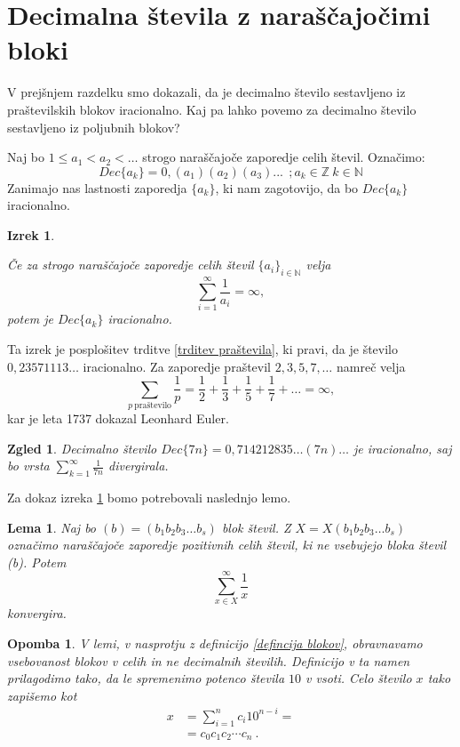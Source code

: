 \documentclass[a4paper,12pt]{article}
\def\N{\mathbb{N}} %
\def\Z{\mathbb{Z}} %
\newtheorem{izrek}{Izrek}
\newtheorem{lema}{Lema}
\newtheorem{opomba}{Opomba}
\newtheorem{zgled}{Zgled}
\begin{document}
\section{Decimalna števila z naraščajočimi bloki}

V prejšnjem razdelku smo dokazali, da je decimalno število sestavljeno iz praštevilskih
blokov iracionalno. Kaj pa lahko povemo za decimalno število sestavljeno iz poljubnih blokov?

Naj bo $1 \leq a_1 < a_2 < \dots $ strogo naraščajoče zaporedje celih števil. 
Označimo: \[Dec\{a_k\} = 0,(a_1)(a_2)(a_3)... \  \ ;  a_k \in \Z \ k \in \N \]
Zanimajo nas lastnosti zaporedja $\{a_k\}$, ki nam zagotovijo, da bo $Dec\{a_k\}$ iracionalno.


\begin{izrek}\label{irac1}
    
    Če za strogo naraščajoče zaporedje celih števil $\{a_i\}_{i \in \N}$ velja 
    \[ \sum_{i=1}^{\infty} \frac{1}{a_i} = \infty ,\]
    potem je $Dec\{a_k\}$ iracionalno.
\end{izrek}

Ta izrek je posplošitev trditve \ref{trditev praštevila}, ki pravi, da je število $0,23571113 \dots$
iracionalno. Za zaporedje praštevil $2, 3, 5, 7, \dots$ namreč velja
\[
    \sum_{p \ \text{praštevilo}}\frac{1}{p} = \frac{1}{2} + \frac{1}{3} + \frac{1}{5} + \frac{1}{7} + \dots = \infty ,\]
kar je leta 1737 dokazal Leonhard Euler.

\begin{zgled}
    Decimalno število $Dec\{7n\} = 0,714212835\dots (7n) \dots$ je iracionalno, saj
    bo vrsta $\sum_{k=1}^{\infty}\frac{1}{7n} $ divergirala.
\end{zgled}

Za dokaz izreka \ref{irac1} bomo potrebovali naslednjo lemo.

\begin{lema}
    Naj bo $(b) = (b_1b_2b_3 \dots b_s)$ blok števil. Z $X = X(b_1b_2b_3 \dots b_s)$ označimo
    naraščajoče zaporedje pozitivnih celih števil, ki ne vsebujejo bloka števil (b). Potem 
    \[ \sum_{x \in X}^{\infty} \frac{1}{x}\] konvergira.
\end{lema}

\begin{opomba}
    \label{lema bloki}
    V lemi, v nasprotju z definicijo \ref{defincija blokov}, obravnavamo vsebovanost blokov v celih
    in ne decimalnih številih. Definicijo v ta namen prilagodimo tako, da le spremenimo potenco števila
    $10$ v vsoti. Celo število $x$ tako zapišemo kot 
    \[ 
        \begin{split}
            x & = \sum^n_{i=1} c_i 10^{n-i} = \\
            & = c_0c_1c_2 \cdots c_n \ .
        \end{split} \]
\end{opomba}
\end{document}
